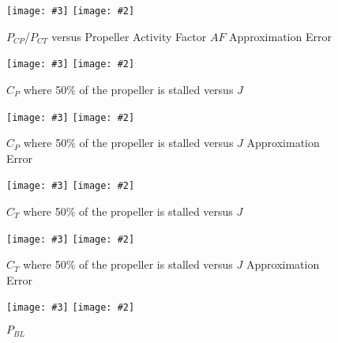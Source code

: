 \documentclass[a4paper,10pt,pdftex]{article}
\newcommand{\jnxfig}[3][]{\ifmypdf\texttt{[image: \#3]}
  \else\texttt{[image: \#2]}\fi}
\begin{document}
\begin{figure}[!htbp]
  \begin{center}
    \jnxfig[angle=0,width=\linewidth]{propafcpcterr.eps}{propafcpcterr.pdf}
    \caption{$P_{CP}$/$P_{CT}$ versus Propeller Activity Factor $AF$ Approximation Error}
    \label{fig:propafcpcterr}
  \end{center}
\end{figure}

\begin{figure}[!htbp]
  \begin{center}
    \jnxfig[angle=0,width=\linewidth]{propcpstal.eps}{propcpstal.pdf}
    \caption{$C_P$ where 50\% of the propeller is stalled versus $J$}
    \label{fig:propcpstal}
  \end{center}
\end{figure}

\begin{figure}[!htbp]
  \begin{center}
    \jnxfig[angle=0,width=\linewidth]{propcpstalerr.eps}{propcpstalerr.pdf}
    \caption{$C_P$ where 50\% of the propeller is stalled versus $J$ Approximation Error}
    \label{fig:propcpstalerr}
  \end{center}
\end{figure}

\begin{figure}[!htbp]
  \begin{center}
    \jnxfig[angle=0,width=\linewidth]{propctstal.eps}{propctstal.pdf}
    \caption{$C_T$ where 50\% of the propeller is stalled versus $J$}
    \label{fig:propctstal}
  \end{center}
\end{figure}

\begin{figure}[!htbp]
  \begin{center}
    \jnxfig[angle=0,width=\linewidth]{propctstalerr.eps}{propctstalerr.pdf}
    \caption{$C_T$ where 50\% of the propeller is stalled versus $J$ Approximation Error}
    \label{fig:propctstalerr}
  \end{center}
\end{figure}

\begin{figure}[!htbp]
  \begin{center}
    \jnxfig[angle=0,width=\linewidth]{proppbl.eps}{proppbl.pdf}
    \caption{$P_{BL}$}
    \label{fig:proppbl}
  \end{center}
\end{figure}
\clearpage
\end{document}

